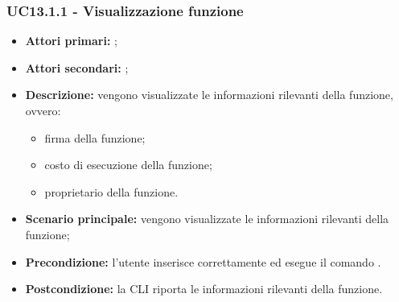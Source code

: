 \subsubsection{UC13.1.1 - Visualizzazione funzione }
\begin{itemize}
	\item \textbf{Attori primari:} \ua{};
	\item \textbf{Attori secondari:} \re{};
	\item \textbf{Descrizione:} vengono visualizzate le informazioni rilevanti della funzione, ovvero:
	\begin{itemize}
		\item firma della funzione;
		\item costo di esecuzione della funzione; 
		\item proprietario della funzione. 
	\end{itemize}
	\item \textbf{Scenario principale:} vengono visualizzate le informazioni rilevanti della funzione;
	\item \textbf{Precondizione:} l'utente inserisce correttamente ed esegue il comando \lista{}.
	\item \textbf{Postcondizione:} la CLI riporta le informazioni rilevanti della funzione.  
\end{itemize}